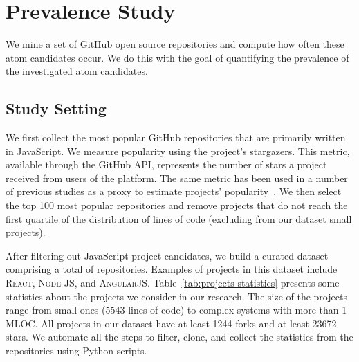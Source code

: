 \section{Prevalence Study}\label{sec:s04}


We mine a set of GitHub open source repositories and compute how often these atom candidates occur. We do this with the goal of quantifying the prevalence of the investigated atom candidates. 

\subsection{Study Setting}

We first collect the most popular GitHub repositories that are primarily written in JavaScript. We measure popularity using the project's stargazers. This metric, available through the GitHub API, represents the number of stars a project received from users of the platform. The same metric has been used in a number of previous studies as a proxy to estimate projects' popularity~\cite{gyimesi2019bugsjs,canedo:esem2020}. We then select the top 100 most popular repositories and remove projects that do not reach the first quartile of the distribution of lines of code (excluding from our dataset small projects). 

After filtering out JavaScript project candidates, we build a curated dataset comprising a total of \minedprojects repositories. Examples of projects in this dataset include \textsc{React}, \textsc{Node JS}, and \textsc{AngularJS}. Table~\ref{tab:projects-statistics} presents some statistics about the projects we consider in our research. The size of the projects range from small ones (5543 lines of code) to complex systems with more than 1 MLOC. All projects in our dataset have at least \num[group-separator = {,}]{1244} forks and at least \num[group-separator = {,}]{23672} stars. We automate all the steps to filter, clone, and collect the statistics from the repositories using Python scripts.

